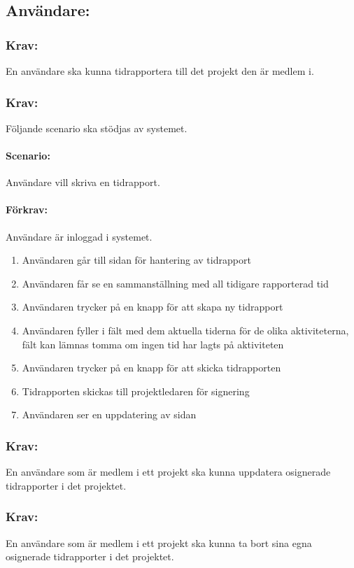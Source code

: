 \documentclass[paper=a4, fontsize=11pt,twoside]{article}
\begin{document}
\subsection{Användare:}
\subsubsection{Krav:} En användare ska kunna tidrapportera till det projekt den är medlem i.

\subsubsection{Krav:} Följande scenario ska stödjas av systemet.
\paragraph{Scenario:} Användare vill skriva en tidrapport.
\paragraph{Förkrav:}
Användare är inloggad i systemet.
\begin{enumerate}
\item Användaren går till sidan för hantering av tidrapport
\item Användaren får se en sammanställning med all tidigare rapporterad tid
\item Användaren trycker på en knapp för att skapa ny tidrapport
\item Användaren fyller i fält med dem aktuella tiderna för de olika aktiviteterna, fält kan lämnas tomma om ingen tid har lagts på aktiviteten
\item	Användaren trycker på en knapp för att skicka tidrapporten
\item Tidrapporten skickas till projektledaren för signering
\item Användaren ser en uppdatering av sidan
\end{enumerate}

\subsubsection{Krav:} En användare som är medlem i ett projekt ska kunna uppdatera osignerade tidrapporter i det projektet.

\subsubsection{Krav:} En användare som är medlem i ett projekt ska kunna ta bort sina egna osignerade tidrapporter i det projektet.
\end{document}
